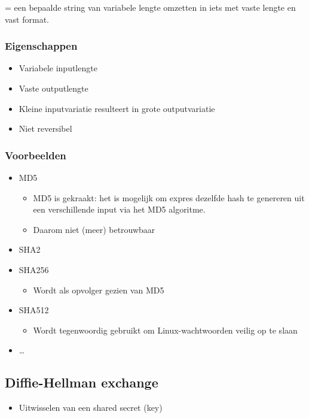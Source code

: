 \documentclass{article}
\begin{document}
= een bepaalde string van variabele lengte omzetten in iets met vaste lengte en vast format. 

\subsubsection{Eigenschappen}

\begin{itemize}
    \item Variabele inputlengte
    \item Vaste outputlengte
    \item Kleine inputvariatie resulteert in grote outputvariatie
    \item Niet reversibel
\end{itemize}

\subsubsection{Voorbeelden}

\begin{itemize}
    \item MD5
    \begin{itemize}
        \item MD5 is gekraakt: het is mogelijk om expres dezelfde hash te genereren uit een verschillende input via het MD5 algoritme.
        \item Daarom niet (meer) betrouwbaar
    \end{itemize}
    \item SHA2
    \item SHA256
    \begin{itemize}
        \item Wordt als opvolger gezien van MD5
    \end{itemize}
    \item SHA512
    \begin{itemize}
        \item Wordt tegenwoordig gebruikt om Linux-wachtwoorden veilig op te slaan
    \end{itemize}
    \item \dots
\end{itemize}

\subsection{Diffie-Hellman exchange}

\begin{itemize}
    \item Uitwisselen van een shared secret (key)
\end{itemize}
\end{document}
